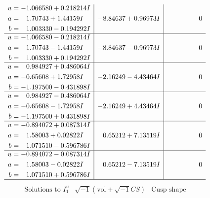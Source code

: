 \documentclass[1p]{elsarticle_modified}
\theoremstyle{definition}
\newcommand{\I}{\sqrt{-1}}
\begin{document}
$$\begin{array}{c|c|c}
\begin{aligned}
u &= -1.066580 + 0.218214 I \\
a &= \phantom{-}1.70743 + 1.44159 I \\
b &= \phantom{-}1.003330 - 0.194292 I\end{aligned}
 & -8.84637 + 0.96973 I & \phantom{-0.000000 } 0 \\ \hline\begin{aligned}
u &= -1.066580 - 0.218214 I \\
a &= \phantom{-}1.70743 - 1.44159 I \\
b &= \phantom{-}1.003330 + 0.194292 I\end{aligned}
 & -8.84637 - 0.96973 I & \phantom{-0.000000 } 0 \\ \hline\begin{aligned}
u &= \phantom{-}0.984927 + 0.486064 I \\
a &= -0.65608 + 1.72958 I \\
b &= -1.197500 - 0.431898 I\end{aligned}
 & -2.16249 - 4.43464 I & \phantom{-0.000000 } 0 \\ \hline\begin{aligned}
u &= \phantom{-}0.984927 - 0.486064 I \\
a &= -0.65608 - 1.72958 I \\
b &= -1.197500 + 0.431898 I\end{aligned}
 & -2.16249 + 4.43464 I & \phantom{-0.000000 } 0 \\ \hline\begin{aligned}
u &= -0.894072 + 0.087314 I \\
a &= \phantom{-}1.58003 + 0.02822 I \\
b &= \phantom{-}1.071510 - 0.596786 I\end{aligned}
 & \phantom{-}0.65212 + 7.13519 I & \phantom{-0.000000 } 0 \\ \hline\begin{aligned}
u &= -0.894072 - 0.087314 I \\
a &= \phantom{-}1.58003 - 0.02822 I \\
b &= \phantom{-}1.071510 + 0.596786 I\end{aligned}
 & \phantom{-}0.65212 - 7.13519 I & \phantom{-0.000000 } 0\\
 \hline 
 \end{array}$$\newpage$$\begin{array}{c|c|c}  
\text{Solutions to }I^u_{1}& \I (\text{vol} + \sqrt{-1}CS) & \text{Cusp shape}\\
 \hline 
\begin{aligned}

\end{aligned}
\end{array}$$
\end{document}
